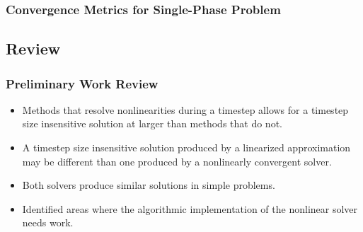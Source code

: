 \documentclass[compress,xcolor=table]{beamer}
\begin{document}
\begin{frame}
\frametitle{Convergence Metrics for Single-Phase Problem}

\begin{table}[h!t]
\centering
{}
\end{table}

\end{frame}
\subsection[Review]{Review}
\begin{frame}
\frametitle{Preliminary Work Review}

\begin{itemize}
\item{Methods that resolve nonlinearities during a timestep allows for a timestep size insensitive solution at larger \dtmax{} than methods that do not.}
\item{A timestep size insensitive solution produced by a linearized approximation may be different than one produced by a nonlinearly convergent solver.}
\item{Both solvers produce similar solutions in simple problems.}
\item{Identified areas where the algorithmic implementation of the nonlinear solver needs work.}
\end{itemize}

\end{frame}
\end{document}
